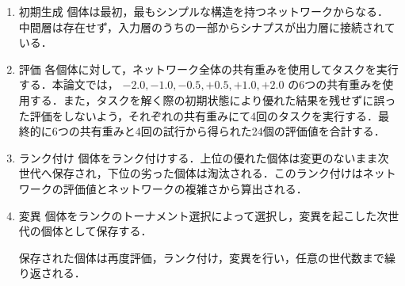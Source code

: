 \begin{enumerate}
    \item 初期生成
    個体は最初，最もシンプルな構造を持つネットワークからなる．中間層は存在せず，入力層のうちの一部からシナプスが出力層に接続されている．

    \item 評価
    各個体に対して，ネットワーク全体の共有重みを使用してタスクを実行する．本論文では， $ -2.0, -1.0, -0.5, +0.5, +1.0, +2.0 $ の6つの共有重みを使用する．また，タスクを解く際の初期状態により優れた結果を残せずに誤った評価をしないよう，それぞれの共有重みにて4回のタスクを実行する．最終的に6つの共有重みと4回の試行から得られた24個の評価値を合計する．

    \item ランク付け
    個体をランク付けする．上位の優れた個体は変更のないまま次世代へ保存され，下位の劣った個体は淘汰される．このランク付けはネットワークの評価値とネットワークの複雑さから算出される．

    \item 変異
    個体をランクのトーナメント選択\cite{遺伝的アルゴリズム}によって選択し，変異を起こした次世代の個体として保存する．

    保存された個体は再度評価，ランク付け，変異を行い，任意の世代数まで繰り返される．
\end{enumerate}

